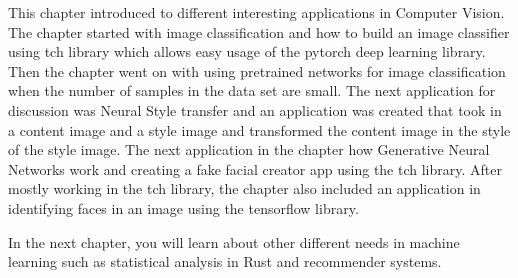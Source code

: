 \documentclass{book}
\begin{document}
This chapter introduced to different interesting applications in Computer Vision. The chapter started with image classification and how to build an image classifier using tch library which allows easy usage of the pytorch deep learning library. Then the chapter went on with using pretrained networks for image classification when the number of samples in the data set are small. The next application for discussion was Neural Style transfer and an application was created that took in a content image and a style image and transformed the content image in the style of the style image. The next application in the chapter how Generative Neural Networks work and creating a fake facial creator app using the tch library. After mostly working in the tch library, the chapter also included an application in identifying faces in an image using the tensorflow library.

In the next chapter, you will learn about other different needs in machine learning such as statistical analysis in Rust and recommender systems.
\label{sec:conclusion}

\printbibliography
\nocite{*}
\end{document}
